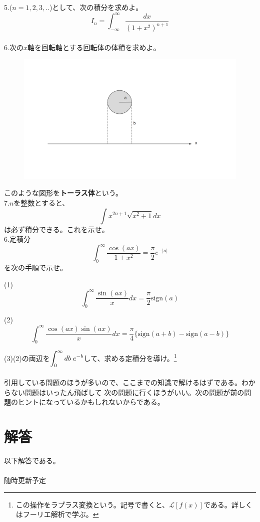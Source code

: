\documentclass[a4j,dvipdfmx]{jsarticle}
\begin{document}
5.($n=1,2,3,..$)として、次の積分を求めよ。
\begin{equation*}
    I_n=\int_{-\infty}^{\infty}\frac{dx}{(1+x^2)^{n+1}}
\end{equation*}\\

6.次の$x$軸を回転軸とする回転体の体積を求めよ。
\begin{figure}[h]
    \centering
    \includegraphics[width=15cm,scale=5]{img/回転体問題.png}
\end{figure}
このような図形を\textbf{トーラス体}という。\\

7.$n$を整数とすると、
\begin{equation*}
    \int x^{2n+1}\sqrt{x^2+1}dx
\end{equation*}
は必ず積分できる。これを示せ。\\

6.定積分
\begin{equation*}
    \int_0^\infty\frac{\cos(ax)}{1+x^2}=\frac{\pi}{2}e^{-|a|}
\end{equation*}
を次の手順で示せ。

(1)
\begin{equation*}
    \int_0^\infty \frac{\sin(ax)}{x}dx=\frac{\pi}{2}\mbox{sign}(a)    
\end{equation*}

(2)
\begin{equation*}
    \int_0^\infty \frac{\cos(ax)\sin(ax)}{x}dx=\frac{\pi}{4}\{\mbox{sign}(a+b)-\mbox{sign}(a-b)\}
\end{equation*}

(3)\hspace{2mm}(2)の両辺を$\displaystyle \int_0^\infty db\hspace{1mm}e^{-b}$して、求める定積分を導け。\footnote{この操作をラプラス変換という。記号で書くと、$\mathcal{L}[f(x)]$である。詳しくはフーリエ解析で学ぶ。}\\
\\
引用している問題のほうが多いので、ここまでの知識で解けるはずである。わからない問題はいったん飛ばして
次の問題に行くほうがいい。次の問題が前の問題のヒントになっているかもしれないからである。
\newpage
\part{解答}
以下解答である。
\\
\hrulefill\\

{\huge 随時更新予定}
\end{document}
